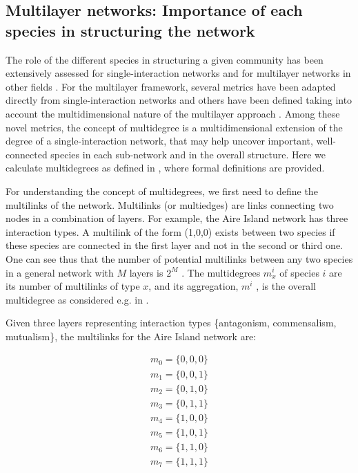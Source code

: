 \subsection*{Multilayer networks: Importance of each species in structuring the network}

The role of the different species in structuring a given community has been extensively assessed for single-interaction networks \citep{Coux2016} and for multilayer networks in other fields \citep{Sole-ribalta2014,DeDomenico2015a}. For the multilayer framework, several metrics have been adapted directly from single-interaction networks and others have been defined taking into account the multidimensional nature of the multilayer approach \citep{DeDomenico2015a}. Among these novel metrics, the concept of multidegree is a multidimensional extension of the degree of a single-interaction network, that may help uncover important, well-connected species in each sub-network and in the overall structure. Here we calculate multidegrees as defined in \cite{Boccaletti2014}, where formal definitions are provided.

For understanding the concept of multidegrees, we first need to define the multilinks of the network. Multilinks (or multiedges) are links connecting two nodes in a combination of layers. For example, the Aire Island network has three interaction types. A multilink of the form (1,0,0) exists between two species if these species are connected in the first layer and not in the second or third one. One can see thus that the number of potential multilinks between any two species in a general network with  $M$  layers is  $2^M$  . The multidegrees  $m_x^i$ of species  $i$ are its number of multilinks of type  $x$, and its aggregation,  $m^i$  , is the overall multidegree as considered e.g. in \cite{Stella2016}.

Given three layers representing interaction types \{antagonism, commensalism, mutualism\}, the multilinks for the Aire Island network are:

\begin{equation*}
\begin{matrix}m_0=\{0,0,0\}\\m_1=\{0,0,1\}\\m_2=\{0,1,0\}\\m_3=\{0,1,1\}\\m_4=\{1,0,0\}\\m_5=\{1,0,1\}\\m_6=\{1,1,0\}\\m_7=\{1,1,1\}\end{matrix}
\end{equation*}

